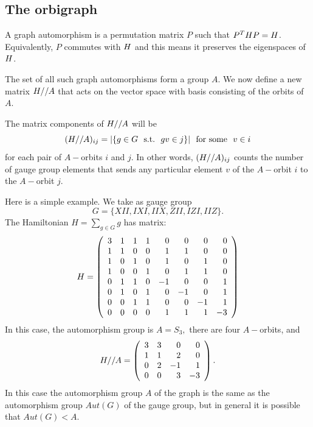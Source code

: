 \documentclass[12pt]{article}
\begin{document}
%

\subsection{The orbigraph}

A graph automorphism is a permutation matrix $P$
such that $P^T H P = H$.
Equivalently, $P$ commutes with $H$ and this means it preserves
the eigenspaces of $H$.

\def\auto{A}
\def\smbox#1{\ \ \mbox{#1}\ \ }
The set of all such graph automorphisms 
form a group $\auto$.
We now define a new matrix $\Ham//\auto$
that acts on the vector space with basis consisting
of the orbits of $\auto.$

The matrix components of $\Ham//\auto$ will be
$$
    (\Ham//\auto)_{ij} = |\{ g\in G \smbox{s.t.} gv \in j \}| \smbox{for some}v\in i
$$
for each pair of $\auto-$orbits $i$ and $j$.
In other words, 
$(\Ham//\auto)_{ij} $ counts the number of gauge group
elements that sends any particular element $v$ of the 
$\auto-$orbit $i$ to the $\auto-$orbit $j.$

Here is a simple example. %
We take as gauge group 
$$G = \{XII, IXI, IIX, ZII, IZI, IIZ\}.$$
The Hamiltonian $H = \sum_{g\in G} g$ has matrix:
$$
H = \left(\begin{array}{rrrrrrrr}
 3 &  1 &  1 &  1 &  0 &  0 &  0 &  0 \cr
  1 &  1 &  0 &  0 &  1 &  1 &  0 &  0 \cr
  1 &  0 &  1 &  0 &  1 &  0 &  1 &  0 \cr
  1 &  0 &  0 &  1 &  0 &  1 &  1 &  0 \cr
  0 &  1 &  1 &  0 & -1 &  0 &  0 &  1 \cr
  0 &  1 &  0 &  1 &  0 & -1 &  0 &  1 \cr
  0 &  0 &  1 &  1 &  0 &  0 & -1 &  1 \cr
  0 &  0 &  0 &  0 &  1 &  1 &  1 & -3
\end{array}\right)
$$
In this case, the automorphism group is $\auto=S_3,$
there are four $\auto-$orbits, and
$$
H//\auto = \left(\begin{array}{rrrr}
 3 &  3 &  0 &  0 \cr
  1 &  1 &  2 &  0 \cr
  0 &  2 & -1 &  1 \cr
  0 &  0 &  3 & -3
\end{array}\right).
$$
In this case the automorphism group $\auto$ of the graph
is the same as the automorphism group $Aut(G)$ of the gauge group,
but in general it is possible that $Aut(G) < \auto.$
\end{document}
